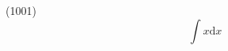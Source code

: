 \documentclass[parskip=full]{article}
\newcommand{\dd}[1]{\text{d}{#1}}
\newcommand{\page}[2]{
    \hfill (#1)
    \vspace*{2cm}
    \begin{equation*}
        #2
    \end{equation*}
    \newpage
}
\begin{document}
\page{1001}{\int{x\dd{x}}}
\end{document}
